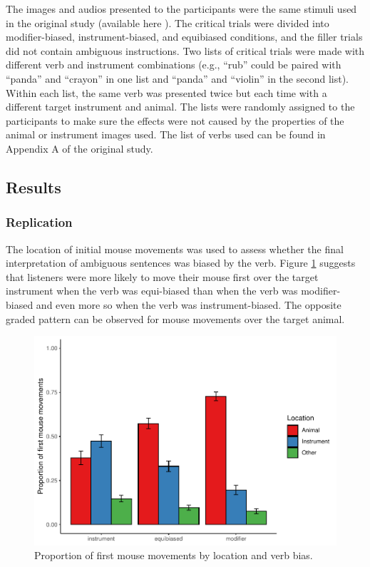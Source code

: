 \documentclass[
  man,floatsintext]{apa6}
\begin{document}
The images and audios presented to the participants were the same
stimuli used in the original study (available here ). The critical
trials were divided into modifier-biased, instrument-biased, and
equibiased conditions, and the filler trials did not contain ambiguous
instructions. Two lists of critical trials were made with different verb
and instrument combinations (e.g., ``rub'' could be paired with ``panda''
and ``crayon'' in one list and ``panda'' and ``violin'' in the second list).
Within each list, the same verb was presented twice but each time with a
different target instrument and animal. The lists were randomly assigned
to the participants to make sure the effects were not caused by the
properties of the animal or instrument images used. The list of verbs
used can be found in Appendix A of the original study.

\hypertarget{results-3}{%
\subsection{Results}\label{results-3}}

\hypertarget{replication-2}{%
\subsubsection{Replication}\label{replication-2}}

The location of initial mouse movements was used to assess whether the final interpretation of ambiguous sentences was biased by the verb. Figure \ref{fig:E4-mouse-moves-fig} suggests that listeners were more likely to move their mouse first over the target instrument when the verb was equi-biased than when the verb was modifier-biased and even more so when the verb was instrument-biased. The opposite graded pattern can be observed for mouse movements over the target animal.

\begin{figure}
\centering
\includegraphics{manuscript_files/figure-latex/E4-mouse-moves-fig-1.pdf}
\caption{\label{fig:E4-mouse-moves-fig}Proportion of first mouse movements by location and verb bias.}
\end{figure}
\end{document}
